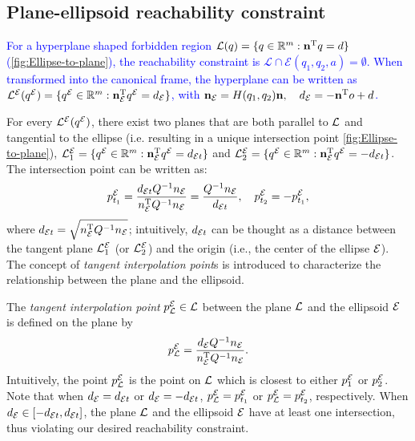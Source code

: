 \documentclass[10pt,twocolumn,twoside]{IEEEtran}
\newcommand{\new}[1]{\textcolor{blue}{#1}}
\newcommand{\news}{\color{blue}}
\begin{document}
\subsection{Plane-ellipsoid reachability constraint}\label{sec:ellipsoide-plane}

\new{For a hyperplane shaped forbidden region $\mathcal{L}(q) = \{q\in\mathbb{R}^m: \mathbf{n}^\mathrm{T} q = d\}$ (\cref{fig:Ellipse-to-plane}), the reachability constraint is $\mathcal{L} \cap \mathcal{E}(q_1,q_2,a) = \emptyset$. When transformed into the canonical frame, the hyperplane can be written as ${\mathcal{L}^{\mathcal{E}}}({q^{\mathcal{E}}}) = \{  {q^{\mathcal{E}}}\in\mathbb{R}^m:  \mathbf{n}_{\mathcal{E}}^\mathrm{T} {q^{\mathcal{E}}} = d_{\mathcal{E}}\}$, with $\mathbf{n}_{\mathcal{E}} = H(q_1,q_2)\mathbf{n}, \quad d_{\mathcal{E}} =-\mathbf{n}^\mathrm{T} o + d$.}

For every ${\mathcal{L}^{\mathcal{E}}}({q^{\mathcal{E}}})$, there exist two planes that are both parallel to $\mathcal{L}$ and tangential to the ellipse (i.e. resulting in a unique intersection point \cref{fig:Ellipse-to-plane}), $\mathcal{L}_1^{\mathcal{E}} = \{{q^{\mathcal{E}}}\in\mathbb{R}^m: \mathbf{n}_{\mathcal{E}} ^\mathrm{T} {q^{\mathcal{E}}} =  d_{\mathcal{E} t} \}$ and $\mathcal{L}_2^{\mathcal{E}} = \{{q^{\mathcal{E}}}\in\mathbb{R}^m: \mathbf{n}_{\mathcal{E}} ^\mathrm{T} {q^{\mathcal{E}}} = - d_{\mathcal{E} t} \}$. The intersection point can be written as:
\begin{equation}
    p^{\mathcal{E}}_{t_{1}} = \frac{ d_{\mathcal{E} t} Q^{-1}   n_{\mathcal{E}}}{ n_{\mathcal{E}} ^\mathrm{T} Q^{-1}  n_{\mathcal{E}}} = \frac{Q^{-1} n_{\mathcal{E}}}{ d_{\mathcal{E} t}},\quad  p^{\mathcal{E}}_{t_{2}} = -  p^{\mathcal{E}}_{t_{1}},
\end{equation}
where $d_{\mathcal{E} t} = \sqrt{ n_{\mathcal{E}}^\mathrm{T} Q^{-1} n_{\mathcal{E}}}$; intuitively, $d_{\mathcal{E} t}$ can be thought as a distance between the tangent plane $\mathcal{L}_1^{\mathcal{E}}$ (or $\mathcal{L}_2^{\mathcal{E}}$) and the origin (i.e., the center of the ellipse $\mathcal{E}$). The concept of \emph{tangent interpolation point}s is introduced to characterize the relationship between the plane and the ellipsoid.

\begin{definition}
 {\news The \emph{tangent interpolation point} $p^{\mathcal{E}}_{\mathcal{L}} \in \mathcal{L}$ between the plane $\mathcal{L}$ and the ellipsoid $\mathcal{E}$ is defined on the plane by } 
    \begin{equation}\label{equ:ProjectPoint}
      p^{\mathcal{E}}_{\mathcal{L}} = \frac{ d_{\mathcal{E}} Q^{-1} n_{\mathcal{E}}}{ n_{\mathcal{E}}^\mathrm{T} Q^{-1} n_{\mathcal{E}}}.
    \end{equation}
  Intuitively, the point $p^{\mathcal{E}}_{\mathcal{L}}$ is the point on $\mathcal{L}$ which is closest to either $p^{\mathcal{E}}_1$ or $p^{\mathcal{E}}_2$.
  Note that when  $d_{\mathcal{E}}=d_{\mathcal{E} t}$ or $d_{\mathcal{E}}=-d_{\mathcal{E} t}$, $p^{\mathcal{E}}_{\mathcal{L}}=p^{\mathcal{E}}_{t_1}$ or $p^{\mathcal{E}}_{\mathcal{L}}=p^{\mathcal{E}}_{t_2}$, respectively. When $ d_{\mathcal{E}} \in [- d_{\mathcal{E} t},  d_{\mathcal{E} t}]$, the plane $\mathcal{L}$ and the ellipsoid $\mathcal{E}$ have at least one intersection, thus violating our desired reachability constraint. 
\end{definition}
\end{document}
